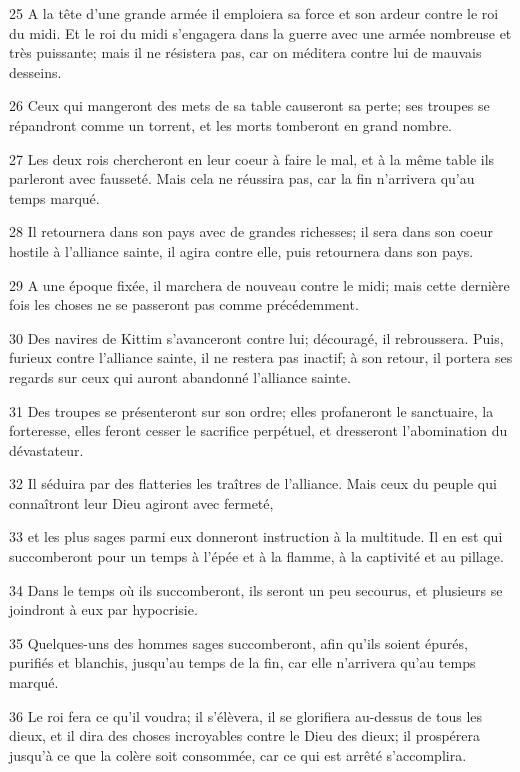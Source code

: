 \par 25 A la tête d'une grande armée il emploiera sa force et son ardeur contre le roi du midi. Et le roi du midi s'engagera dans la guerre avec une armée nombreuse et très puissante; mais il ne résistera pas, car on méditera contre lui de mauvais desseins.
\par 26 Ceux qui mangeront des mets de sa table causeront sa perte; ses troupes se répandront comme un torrent, et les morts tomberont en grand nombre.
\par 27 Les deux rois chercheront en leur coeur à faire le mal, et à la même table ils parleront avec fausseté. Mais cela ne réussira pas, car la fin n'arrivera qu'au temps marqué.
\par 28 Il retournera dans son pays avec de grandes richesses; il sera dans son coeur hostile à l'alliance sainte, il agira contre elle, puis retournera dans son pays.
\par 29 A une époque fixée, il marchera de nouveau contre le midi; mais cette dernière fois les choses ne se passeront pas comme précédemment.
\par 30 Des navires de Kittim s'avanceront contre lui; découragé, il rebroussera. Puis, furieux contre l'alliance sainte, il ne restera pas inactif; à son retour, il portera ses regards sur ceux qui auront abandonné l'alliance sainte.
\par 31 Des troupes se présenteront sur son ordre; elles profaneront le sanctuaire, la forteresse, elles feront cesser le sacrifice perpétuel, et dresseront l'abomination du dévastateur.
\par 32 Il séduira par des flatteries les traîtres de l'alliance. Mais ceux du peuple qui connaîtront leur Dieu agiront avec fermeté,
\par 33 et les plus sages parmi eux donneront instruction à la multitude. Il en est qui succomberont pour un temps à l'épée et à la flamme, à la captivité et au pillage.
\par 34 Dans le temps où ils succomberont, ils seront un peu secourus, et plusieurs se joindront à eux par hypocrisie.
\par 35 Quelques-uns des hommes sages succomberont, afin qu'ils soient épurés, purifiés et blanchis, jusqu'au temps de la fin, car elle n'arrivera qu'au temps marqué.
\par 36 Le roi fera ce qu'il voudra; il s'élèvera, il se glorifiera au-dessus de tous les dieux, et il dira des choses incroyables contre le Dieu des dieux; il prospérera jusqu'à ce que la colère soit consommée, car ce qui est arrêté s'accomplira.
